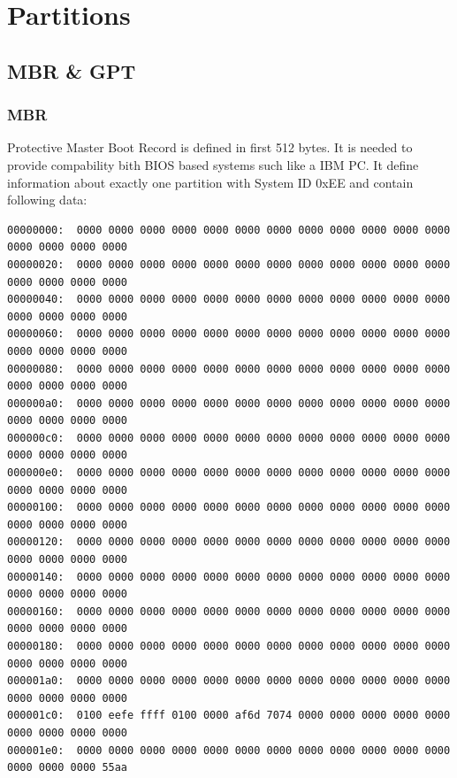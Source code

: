 \documentclass[a4paper,11pt]{article}
\theoremstyle{mytheor}
\begin{document}
\section{Partitions}

\subsection{MBR \& GPT}

\subsubsection{MBR}

Protective Master Boot Record is defined in first 512 bytes. It is needed to provide compability bith BIOS based systems such like a IBM PC. It define information about exactly one partition with System ID 0xEE and contain following data:

\begin{lstlisting}
00000000:  0000 0000 0000 0000 0000 0000 0000 0000 0000 0000 0000 0000 0000 0000 0000 0000
00000020:  0000 0000 0000 0000 0000 0000 0000 0000 0000 0000 0000 0000 0000 0000 0000 0000
00000040:  0000 0000 0000 0000 0000 0000 0000 0000 0000 0000 0000 0000 0000 0000 0000 0000
00000060:  0000 0000 0000 0000 0000 0000 0000 0000 0000 0000 0000 0000 0000 0000 0000 0000
00000080:  0000 0000 0000 0000 0000 0000 0000 0000 0000 0000 0000 0000 0000 0000 0000 0000
000000a0:  0000 0000 0000 0000 0000 0000 0000 0000 0000 0000 0000 0000 0000 0000 0000 0000
000000c0:  0000 0000 0000 0000 0000 0000 0000 0000 0000 0000 0000 0000 0000 0000 0000 0000
000000e0:  0000 0000 0000 0000 0000 0000 0000 0000 0000 0000 0000 0000 0000 0000 0000 0000
00000100:  0000 0000 0000 0000 0000 0000 0000 0000 0000 0000 0000 0000 0000 0000 0000 0000
00000120:  0000 0000 0000 0000 0000 0000 0000 0000 0000 0000 0000 0000 0000 0000 0000 0000
00000140:  0000 0000 0000 0000 0000 0000 0000 0000 0000 0000 0000 0000 0000 0000 0000 0000
00000160:  0000 0000 0000 0000 0000 0000 0000 0000 0000 0000 0000 0000 0000 0000 0000 0000
00000180:  0000 0000 0000 0000 0000 0000 0000 0000 0000 0000 0000 0000 0000 0000 0000 0000
000001a0:  0000 0000 0000 0000 0000 0000 0000 0000 0000 0000 0000 0000 0000 0000 0000 0000
000001c0:  0100 eefe ffff 0100 0000 af6d 7074 0000 0000 0000 0000 0000 0000 0000 0000 0000
000001e0:  0000 0000 0000 0000 0000 0000 0000 0000 0000 0000 0000 0000 0000 0000 0000 55aa


\end{lstlisting}
\end{document}
